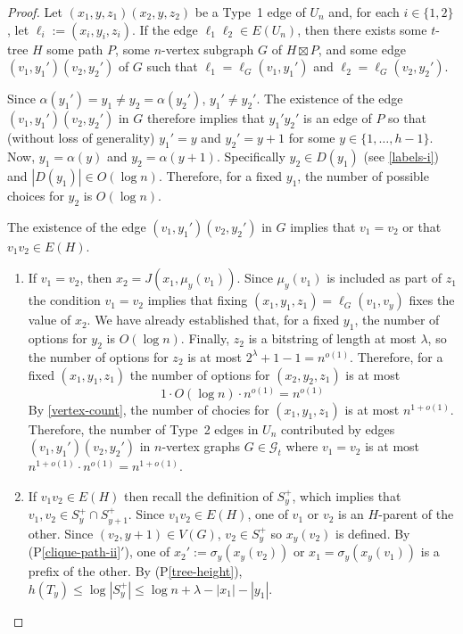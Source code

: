 \documentclass{patmorin}
\newcommand{\pref}[1]{(P\ref{#1})}
\newcommand{\psref}[1]{(P\ref{#1}$'$)}
\begin{document}
\begin{proof}
    Let $(x_1,y,z_1)(x_2,y,z_2)$ be a Type~1 edge of $U_n$ and, for each $i\in\{1,2\}$, let $\ell_i:=(x_i,y_i,z_i)$.  If the edge $\ell_1\ell_2\in E(U_n)$, then there exists some $t$-tree $H$ some path $P$, some $n$-vertex subgraph $G$ of $H\boxtimes P$, and some edge $(v_1,y_1')(v_2,y_2')$ of $G$ such that $\ell_1=\ell_G(v_1,y_1')$ and $\ell_2=\ell_G(v_2,y_2')$.

    Since $\alpha(y_1')=y_1\neq y_2=\alpha(y_2')$, $y_1'\neq y_2'$. The existence of the edge $(v_1,y_1')(v_2,y_2')$ in $G$ therefore implies that $y_1'y_2'$ is an edge of $P$ so that (without loss of generality) $y_1'=y$ and $y_2'=y+1$ for some $y\in\{1,\ldots,h-1\}$.  Now, $y_1=\alpha(y)$ and $y_2=\alpha(y+1)$.  Specifically $y_2\in D(y_1)$ (see \cref{labels-i}) and $|D(y_1)|\in O(\log n)$.  Therefore, for a fixed $y_1$, the number of possible choices for $y_2$ is $O(\log n)$.

    The existence of the edge $(v_1,y_1')(v_2,y_2')$ in $G$ implies that $v_1=v_2$ or that $v_1v_2\in E(H)$.
    \begin{enumerate}
        \item If $v_1=v_2$, then $x_2=J(x_1,\mu_y(v_1))$.  Since $\mu_y(v_1)$ is included as part of $z_1$ the condition $v_1=v_2$ implies that fixing $(x_1,y_1,z_1)=\ell_G(v_1,v_y)$ fixes the value of $x_2$.  We have already established that, for a fixed $y_1$, the number of options for $y_2$ is $O(\log n)$.  Finally, $z_2$ is a bitstring of length at most $\lambda$, so the number of options for $z_2$ is at most $2^\lambda+1-1=n^{o(1)}$.  Therefore, for a fixed $(x_1,y_1,z_1)$ the number of options for $(x_2,y_2,z_1)$ is at most
        \[  1\cdot O(\log n) \cdot n^{o(1)} = n^{o(1)} \]
        By \cref{vertex-count}, the number of chocies for $(x_1,y_1,z_1)$ is at most $n^{1+o(1)}$.  Therefore, the number of Type~2 edges in $U_n$ contributed by edges $(v_1,y_1')(v_2,y_2')$ in $n$-vertex graphs $G\in\mathcal{G}_t$ where $v_1=v_2$ is at most $n^{1+o(1)}\cdot n^{o(1)} = n^{1+o(1)}$.

        \item If $v_1v_2\in E(H)$ then recall the definition of $S^+_y$,  which implies that $v_1,v_2\in S^+_y\cap S^+_{y+1}$.  Since $v_1v_2\in E(H)$, one of $v_1$ or $v_2$ is an $H$-parent of the other. Since $(v_2,y+1)\in V(G)$, $v_2\in S^+_y$ so $x_y(v_2)$ is defined. By \psref{clique-path-ii}, one of $x_2':=\sigma_y(x_y(v_2))$ or $x_1=\sigma_y(x_y(v_1))$ is a prefix of the other.  By \pref{tree-height}, $h(T_y)\le \log|S^+_y|\le\log n+\lambda -|x_1|-|y_1|$.


\end{enumerate}
\end{proof}
\end{document}
